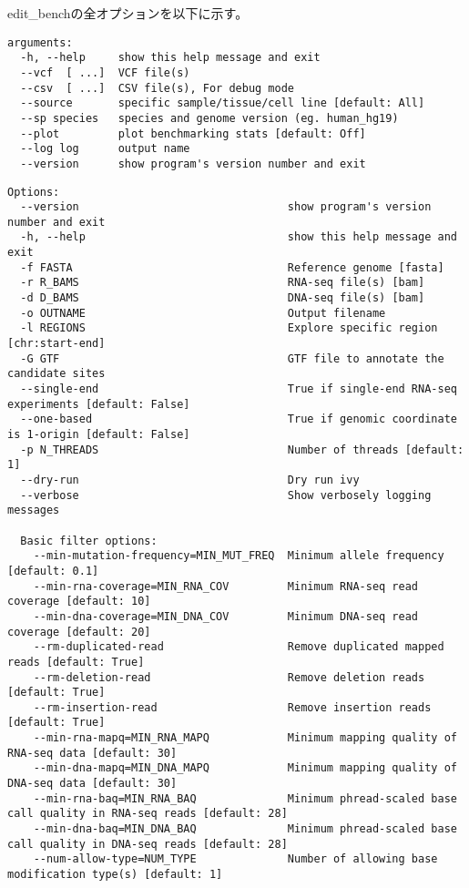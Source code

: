 edit\_benchの全オプションを以下に示す。
\scriptsize
\begin{verbatim}
arguments:
  -h, --help     show this help message and exit
  --vcf  [ ...]  VCF file(s)
  --csv  [ ...]  CSV file(s), For debug mode
  --source       specific sample/tissue/cell line [default: All]
  --sp species   species and genome version (eg. human_hg19)
  --plot         plot benchmarking stats [default: Off]
  --log log      output name
  --version      show program's version number and exit
\end{verbatim}
\normalsize

\scriptsize
\begin{verbatim}
Options:
  --version                                show program's version number and exit
  -h, --help                               show this help message and exit
  -f FASTA                                 Reference genome [fasta]
  -r R_BAMS                                RNA-seq file(s) [bam]
  -d D_BAMS                                DNA-seq file(s) [bam]
  -o OUTNAME                               Output filename
  -l REGIONS                               Explore specific region [chr:start-end]
  -G GTF                                   GTF file to annotate the candidate sites
  --single-end                             True if single-end RNA-seq experiments [default: False]
  --one-based                              True if genomic coordinate is 1-origin [default: False]
  -p N_THREADS                             Number of threads [default: 1]
  --dry-run                                Dry run ivy
  --verbose                                Show verbosely logging messages

  Basic filter options:
    --min-mutation-frequency=MIN_MUT_FREQ  Minimum allele frequency [default: 0.1]
    --min-rna-coverage=MIN_RNA_COV         Minimum RNA-seq read coverage [default: 10]
    --min-dna-coverage=MIN_DNA_COV         Minimum DNA-seq read coverage [default: 20]
    --rm-duplicated-read                   Remove duplicated mapped reads [default: True]
    --rm-deletion-read                     Remove deletion reads [default: True]
    --rm-insertion-read                    Remove insertion reads [default: True]
    --min-rna-mapq=MIN_RNA_MAPQ            Minimum mapping quality of RNA-seq data [default: 30]
    --min-dna-mapq=MIN_DNA_MAPQ            Minimum mapping quality of DNA-seq data [default: 30]
    --min-rna-baq=MIN_RNA_BAQ              Minimum phread-scaled base call quality in RNA-seq reads [default: 28]
    --min-dna-baq=MIN_DNA_BAQ              Minimum phread-scaled base call quality in DNA-seq reads [default: 28]
    --num-allow-type=NUM_TYPE              Number of allowing base modification type(s) [default: 1]


\end{verbatim}

